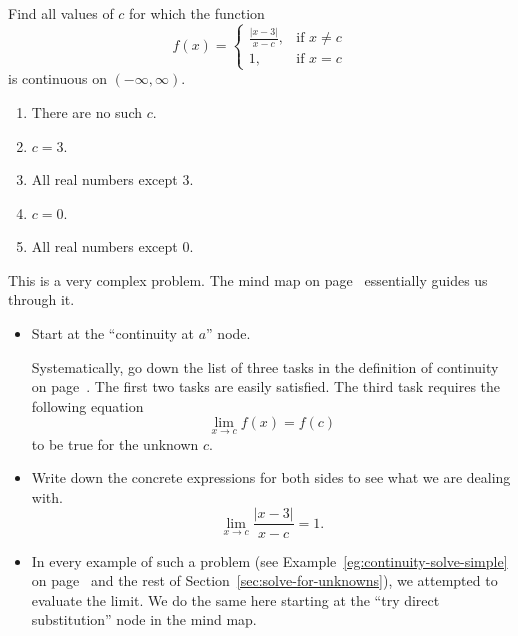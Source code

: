 \documentclass[../main.tex]{subfiles}
\begin{document}
\begin{exercise} \label{ex:midterm-exercise-7}
  Find all values of \(c\) for which the function
  \[
    f(x) =
    \begin{cases}
      \frac{|x - 3|}{x - c}, &\text{if } x \ne c \\
      1, &\text{if } x = c
    \end{cases}
  \]
  is continuous on \((-\infty, \infty)\).
  \begin{enumerate}[label=\Alph*.]
    \item There are no such \(c\).
    \item \(c = 3\).
    \item All real numbers except \(3\).
    \item \(c = 0\).
    \item All real numbers except \(0\).
  \end{enumerate}

  \begin{hint}
    This is a very complex problem. The mind map on page~\pageref{page:mindmap-limits-full} essentially guides us through it.

    \begin{itemize}
      \item Start at the \enquote{continuity at \(a\)} node.

        Systematically, go down the list of three tasks in the definition of continuity on page~\pageref{def:continuity}.  The first two tasks are easily satisfied.  The third task requires the following equation
        \[
          \lim_{x \to c} f(x) = f(c)
        \]
        to be true for the unknown \(c\).

      \item Write down the concrete expressions for both sides to see what we are dealing with.
        \[
          \lim_{x \to c} \frac{|x-3|}{x-c} = 1.
        \]

      \item In every example of such a problem (see Example~\ref{eg:continuity-solve-simple} on page~\pageref{eg:continuity-solve-simple} and the rest of Section~\ref{sec:solve-for-unknowns}), we attempted to evaluate the limit. We do the same here starting at the \enquote{try direct substitution} node in the mind map.


\end{itemize}
\end{hint}
\end{exercise}
\end{document}
